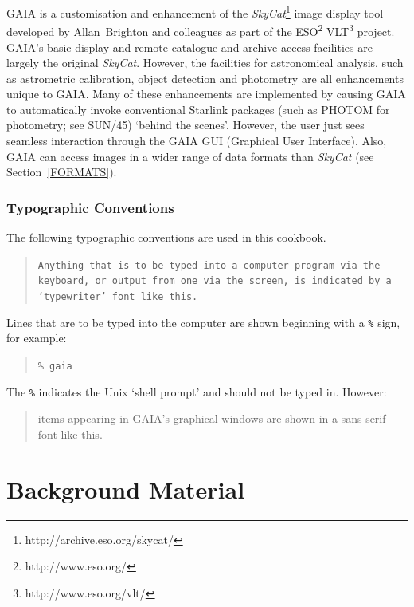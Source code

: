 \documentclass[twoside,11pt]{article}
\newcommand{\stardocinitials}  {SC}
\newcommand{\stardocnumber}    {17.1}
\newcommand{\stardocname}{\stardocinitials /\stardocnumber}
\newcommand{\htmladdnormallinkfoot}[2]{#1\footnote{#2}}
\newcommand{\xref}[3]{#1}
\newcommand{\xlabel}[1]{}
\renewcommand{\_}{\texttt{\symbol{95}}}
\begin{document}
GAIA is a customisation and enhancement of the
\htmladdnormallinkfoot{{\it SkyCat}\/}{http://archive.eso.org/skycat/}
image display tool developed by Allan~Brighton and colleagues as part
of the \htmladdnormallinkfoot{ESO}{http://www.eso.org/}
\htmladdnormallinkfoot{VLT}{http://www.eso.org/vlt/} project.  GAIA's basic
display and remote catalogue and archive access facilities are largely the
original {\it SkyCat}.  However, the facilities for astronomical analysis,
such as astrometric calibration, object detection and photometry are
all enhancements unique to GAIA.  Many of these enhancements are
implemented by causing GAIA to automatically invoke conventional Starlink
packages (such as PHOTOM for photometry; see
\xref{SUN/45}{sun45}{}\/\cite{SUN45}) `behind the scenes'.  However,
the user just sees seamless interaction through the GAIA GUI (Graphical
User Interface).  Also, GAIA can access images in a wider range of
data formats than {\it SkyCat}\/ (see Section~\ref{FORMATS}).

\section{\xlabel{TYPO}\label{TYPO}Typographic Conventions}

The following typographic conventions are used in this cookbook.

\begin{quote}
{\tt Anything that is to be typed into a computer program via the keyboard,
or output from one via the screen, is indicated by a `typewriter' font
like this.}
\end{quote}

Lines that are to be typed into the computer are shown beginning with a
{\tt{\%}} sign, for example:

\begin{quote}
{\tt \% gaia}
\end{quote}

The {\tt{\%}} indicates the Unix `shell prompt' and should not be
typed in.  However:

\begin{quote}
{\sf items appearing in GAIA's graphical windows are shown in a sans
serif font like this.}
\end{quote}


\cleardoublepage
\markboth{\stardocname}{\stardocname}
\part{Background Material}
\markboth{\stardocname}{\stardocname}
\end{document}
